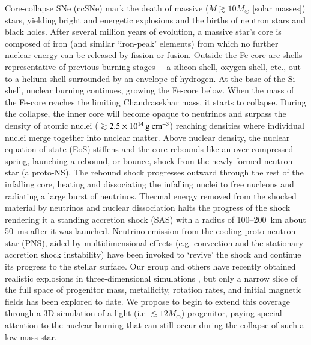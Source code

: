 Core-collapse SNe (ccSNe) mark the death of massive ($M \gtrsim 10 M_{\odot}$ [solar masses]) stars, yielding bright and energetic explosions and the births of neutron stars and black holes.
After several million years of evolution, a massive star's core is composed of iron (and similar `iron-peak' elements) from which no further nuclear energy can be released by fission or fusion.
Outside the Fe-core are shells representative of previous burning stages--- a silicon shell, oxygen shell, etc., out to a helium shell surrounded by an envelope of hydrogen.
At the base of the Si-shell, nuclear burning continues, growing the Fe-core below.
When the mass of the Fe-core reaches the limiting Chandrasekhar mass, it starts to collapse.
During the collapse, the inner core will become opaque to neutrinos and surpass the density of atomic nuclei ($\gtrsim$$2.5\times10^{14}\,{\mathrm{g~cm^{-3}}}$) reaching densities where individual nuclei merge together into nuclear matter.
Above nuclear density, the nuclear equation of state (EoS) stiffens and the core rebounds like an over-compressed spring, launching a rebound, or bounce, shock from the newly formed neutron star (a proto-NS).
The rebound shock progresses outward through the rest of the infalling core, heating and dissociating the infalling nuclei to free nucleons and radiating a large burst of neutrinos. Thermal energy removed from the shocked material by neutrinos and nuclear dissociation halts the progress of the shock rendering it a standing accretion shock (SAS) with a radius of 100--200~km about 50~ms after it was launched. Neutrino emission from the cooling proto-neutron star (PNS), aided by multidimensional effects (e.g. convection and the stationary accretion shock instability) have been invoked to `revive' the shock and continue its progress to the stellar surface. 
Our group and others have recently obtained realistic explosions in three-dimensional simulations , but only a narrow slice of the full space of progenitor mass, metallicity, rotation rates, and initial magnetic fields has been explored to date. We propose to begin to extend this coverage through a 3D simulation of a light (i.e $\lesssim 12 M_{\odot}$) progenitor, paying special attention to the nuclear burning that can still occur during the collapse of such a low-mass star. 
